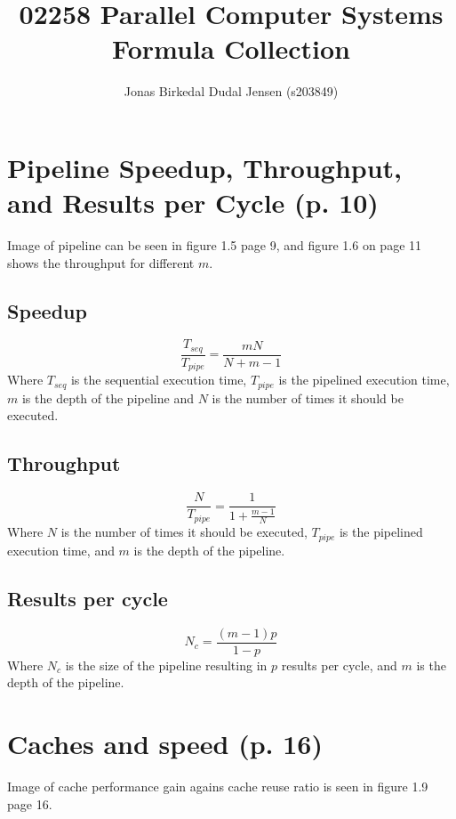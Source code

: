 \documentclass{article}
\title{02258 Parallel Computer Systems Formula Collection}
\author{Jonas Birkedal Dudal Jensen (s203849)}
\date{}
\begin{document}
	\maketitle
	\newpage

	\tableofcontents
	\newpage

	\section{Pipeline Speedup, Throughput, and Results per Cycle (p. 10)}
		Image of pipeline can be seen in figure 1.5 page 9, and figure 1.6 on page 11 shows the throughput for different $m$.

		\subsection{Speedup}
		\begin{equation}
			\frac{T_{seq}}{T_{pipe}}=\frac{mN}{N+m-1}
		\end{equation}
		Where $T_{seq}$ is the sequential execution time, $T_{pipe}$ is the pipelined execution time, $m$ is the depth of the pipeline and $N$ is the number of times it should be executed.

		\subsection{Throughput}
		\begin{equation}
			\frac{N}{T_{pipe}}=\frac{1}{1+\frac{m-1}{N}}
		\end{equation}
		Where $N$ is the number of times it should be executed, $T_{pipe}$ is the pipelined execution time, and $m$ is the depth of the pipeline.

		\subsection{Results per cycle}
		\begin{equation}
			N_c=\frac{(m-1)p}{1-p}
		\end{equation}
		Where $N_c$ is the size of the pipeline resulting in $p$ results per cycle, and $m$ is the depth of the pipeline.
	
	\section{Caches and speed (p. 16)}
		Image of cache performance gain agains cache reuse ratio is seen in figure 1.9 page 16.
\end{document}
